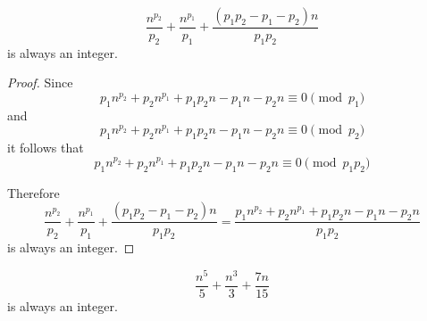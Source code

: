 \begin{prop}
    \[ \frac{n^{p_2}}{p_2} + \frac{n^{p_1}}{p_1} + \frac{(p_1 p_2 - p_1 -
    p_2)n}{p_1 p_2} \]
    is always an integer.
\end{prop}
\begin{proof}
    Since
    \[p_1 n^{p_2} + p_2 n^{p_1} + p_1 p_2 n - p_1 n - p_2 n \equiv 0 \pmod{p_1} \]
    and
    \[p_1 n^{p_2} + p_2 n^{p_1} + p_1 p_2 n - p_1 n - p_2 n \equiv 0 \pmod{p_2} \]
    it follows that
    \[p_1 n^{p_2} + p_2 n^{p_1} + p_1 p_2 n - p_1 n - p_2 n \equiv 0 \pmod{p_1 p_2} \]
    
    Therefore 
    \[ 
    \frac{n^{p_2}}{p_2} + \frac{n^{p_1}}{p_1} + \frac{(p_1 p_2 - p_1 -p_2)n}{p_1 p_2} 
    = 
    \frac {p_1 n^{p_2} + p_2 n^{p_1} + p_1 p_2 n - p_1 n - p_2 n}{p_1 p_2}
    \]
    is always an integer.
\end{proof}


\begin{example}
    \[ \frac{n^5}{5} + \frac{n^3}{3} + \frac{7n}{15} \]
    is always an integer.
\end{example}
\
